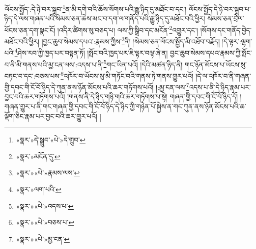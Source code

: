 ལོངས་སྤྱོད་:དེ་ཉེ་བར་སྒྲུབ་\footnote{«སྣར་»དེ་སྒྲུབ་«པེ་»དེ་གྲུབ་}ན་མི་དགེ་བའི་ཆོས་སོགས་པའི་རྒྱུ་ཉིད་དུ་མཐོང་བ་དང་། ལོངས་སྤྱོད་དེ་ཉེ་བར་སྒྲུབ་པ་ཉིད་དེ་ལས་གཞན་པའི་སེམས་ཅན་ཆེས་མང་བ་དག་ལ་གནོད་པའི་རྒྱུ་ཉིད་དུ་མཐོང་བའི་ཕྱིར། སེམས་ཅན་བྲེལ་ཕོངས་ཅན་དག་སྣང་ངོ། །འདིར་ཚིགས་སུ་བཅད་པ། ལས་ཀྱི་སྒྲིབ་དང་མངོན་\footnote{«སྣར་»མངོན་དུ་}འགྱུར་དང་། །སོགས་དང་གནོད་བྱེད་མཐོང་བའི་ཕྱིར། །བྱང་ཆུབ་སེམས་དཔའ་:རྣམས་ཀྱིས་\footnote{«སྣར་»«པེ་»རྣམས་ལས་}ནི། །སེམས་ཅན་ལོངས་སྤྱོད་མི་འཐོབ་བརྗོད། །དེ་ལྟར་:ལྷག་པའི་\footnote{«སྣར་»ལག་པའི་}ཤེས་རབ་ཀྱི་ཁྱད་པར་བསྟན་ཏོ། །སྤོང་བའི་ཁྱད་པར་ཇི་ལྟར་བལྟ་ཞེ་ན། བྱང་ཆུབ་སེམས་དཔའ་རྣམས་ཀྱི་སྤོང་བ་ནི་མི་གནས་པའི་མྱ་ངན་ལས་:འདས་པ་ནི་\footnote{«སྣར་»«པེ་»འདས་པ་}གང་ཡིན་པའོ། །དེའི་མཚན་ཉིད་ནི། གང་ཉོན་མོངས་པ་ཡོངས་སུ་བཏང་བ་དང་:བཅས་པས་\footnote{«སྣར་»«པེ་»བཅས་པ་}འཁོར་བ་ཡོངས་སུ་མི་གཏོང་བའི་གནས་ཏེ་གནས་གྱུར་པའོ། །དེ་ལ་འཁོར་བ་ནི་གཞན་གྱི་དབང་གི་ངོ་བོ་ཉིད་དེ་ཀུན་ནས་ཉོན་མོངས་པའི་ཆར་གཏོགས་པའོ། །:མྱ་ངན་ལས་\footnote{«སྣར་»«པེ་»མྱ་ངན་}འདས་པ་ནི་དེ་ཉིད་རྣམ་པར་བྱང་བའི་ཆར་གཏོགས་པའོ། །གནས་ནི་དེ་ཉིད་གཉི་གའི་ཆར་གཏོགས་པ་སྟེ། གཞན་གྱི་དབང་གི་ངོ་བོ་ཉིད་དོ། །གཞན་གྱུར་པ་ནི་གང་གཞན་གྱི་དབང་གི་ངོ་བོ་ཉིད་དེ་ཉིད་ཀྱི་གཉེན་པོ་སྐྱེས་ན་གང་ཀུན་ནས་ཉོན་མོངས་པའི་ཆ་ལྡོག་ཅིང་རྣམ་པར་བྱང་བའི་ཆར་གྱུར་པའོ། །
